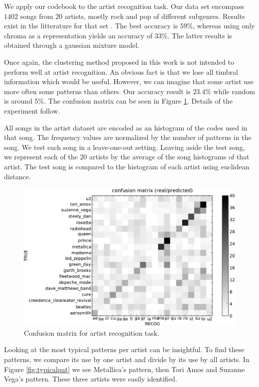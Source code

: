 \documentclass{article}
\begin{document}
We apply our codebook to the artist recognition task.
Our data set encompass $1402$ songs from $20$ artists, 
mostly rock and pop of different subgenres. Results exist in the
litterature for that set \cite{Ellis2007}. The best accuracy is
$59\%$, whereas using only chroma as a representation yields an
accuracy of $33\%$. The latter results is obtained through a
gaussian mixture model.

Once again, the clustering method proposed in this work is not
intended to perform well at artist recognition. An obvious fact is that
we lose all timbral information which would be useful. However, we can
imagine that some artist use more often some patterns than others.
Our accuracy result is $23.4\%$ while random
is around $5\%$. 
The confusion matrix can be seen in Figure \ref{fig:conf_mat}.
Details of the experiment follow.

All songs in the artist dataset are encoded as an histogram of the codes
used in that song. The frequency values are normalized by the number
of patterns in the song. We test each song in a leave-one-out setting.
Leaving aside the test song, we represent each of the $20$ artists by the 
average of
the song histograms of that artist. The test song is compared to
the histogram of each artist using euclidean distance.


\begin{figure}[htb]
\includegraphics[width=.9\columnwidth]{conf_mat_per_artist}
\caption{\small{Confusion matrix for artist recognition task.}}
\label{fig:conf_mat}
\end{figure}

Looking at the most typical patterns per artist can be insightful.
To find these patterns, we compare its use by one artist and divide
by its use by all artists. In Figure \ref{fig:typicalpat} we see 
Metallica's pattern, then Tori Amos and
Suzanne Vega's pattern. These three artists were easily identified.
\end{document}
